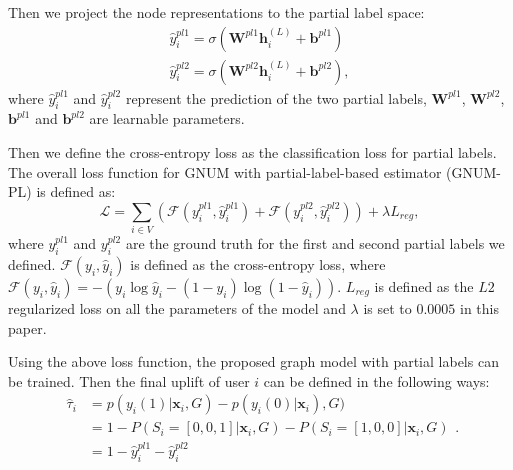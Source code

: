 Then we project the node representations to the partial label space:
\begin{equation} 
\begin{split}
    \hat{y}_i^{pl1} = \sigma(\mathbf{W}^{pl1}\mathbf{h}_i^{(L)}+\mathbf{b}^{pl1})  \\
    \hat{y}_i^{pl2} = \sigma(\mathbf{W}^{pl2}\mathbf{h}_i^{(L)}+\mathbf{b}^{pl2}), 
\label{eqn:partial_resp}
\end{split}
\end{equation}
where $\hat{y}_i^{pl1}$ and $\hat{y}_i^{pl2}$ represent the prediction of the two partial labels, $\mathbf{W}^{pl1}$, $\mathbf{W}^{pl2}$, $\mathbf{b}^{pl1}$ and $\mathbf{b}^{pl2}$ are learnable parameters.

Then we define the cross-entropy loss as the classification loss for partial labels. The overall loss function for GNUM with partial-label-based estimator (GNUM-PL) is defined as: 
\begin{equation}
	\mathcal{L} =  \sum_{i \in {V}} 
	(\mathcal{F}(y_i^{pl1}, \hat{y}_{i}^{pl1}) + \mathcal{F}(y_i^{pl2}, \hat{y}_{i}^{pl2}))+\lambda  L_{reg}, 
\label{eq:gnum_loss}
\end{equation}
where $y_i^{pl1}$ and $y_i^{pl2}$ are the ground truth for the first and second partial labels we defined. $\mathcal{F}(y_i, \hat{y}_{i})$ is defined as the cross-entropy loss, where $\mathcal{F}(y_i, \hat{y}_{i})=- ( {y}_{i} \log \hat{y}_{i} - (1- {y}_{i}) \log (1 -\hat{y}_{i}))$. $L_{reg}$ is defined as the $L2$ regularized loss on all the parameters of the model and $\lambda$ is set to $0.0005$ in this paper.  

Using the above loss function, the proposed graph model with partial labels can be trained. Then the final uplift of user $i$ can be defined in the following ways:
\begin{equation} 
\begin{split}
	 \hat{\tau}_i &= p(y_i(1)|\mathbf{x}_i,\mathit{G}) - p(y_i(0)|\mathbf{x}_i),\mathit{G}) \\
	              &= 1 - P(S_i=[0, 0, 1]|\mathbf{x}_i,\mathit{G}) - P(S_i=[1, 0, 0]|\mathbf{x}_i,\mathit{G})  \\
	              &= 1-\hat{y}_i^{pl1}-\hat{y}_i^{pl2} \nonumber 
\end{split}.
\end{equation}

